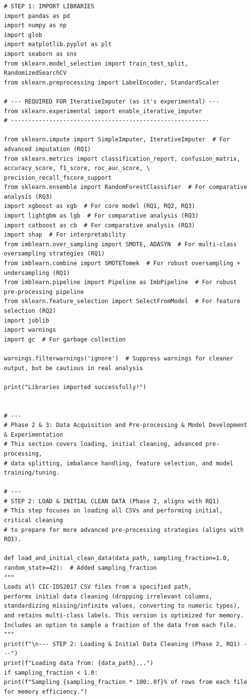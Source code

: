 \begin{lstlisting}[caption={Complete pipeline of XGBoost using CIC-IDS2017 in NIDS using Python}, label={lst:python-pipeline}]
# STEP 1: IMPORT LIBRARIES
import pandas as pd
import numpy as np
import glob
import matplotlib.pyplot as plt
import seaborn as sns
from sklearn.model_selection import train_test_split, RandomizedSearchCV
from sklearn.preprocessing import LabelEncoder, StandardScaler

# --- REQUIRED FOR IterativeImputer (as it's experimental) ---
from sklearn.experimental import enable_iterative_imputer
# ---------------------------------------------------------

from sklearn.impute import SimpleImputer, IterativeImputer  # For advanced imputation (RQ1)
from sklearn.metrics import classification_report, confusion_matrix, accuracy_score, f1_score, roc_auc_score, \
precision_recall_fscore_support
from sklearn.ensemble import RandomForestClassifier  # For comparative analysis (RQ3)
import xgboost as xgb  # For core model (RQ1, RQ2, RQ3)
import lightgbm as lgb  # For comparative analysis (RQ3)
import catboost as cb  # For comparative analysis (RQ3)
import shap  # For interpretability
from imblearn.over_sampling import SMOTE, ADASYN  # For multi-class oversampling strategies (RQ1)
from imblearn.combine import SMOTETomek  # For robust oversampling + undersampling (RQ1)
from imblearn.pipeline import Pipeline as ImbPipeline  # For robust pre-processing pipeline
from sklearn.feature_selection import SelectFromModel  # For feature selection (RQ2)
import joblib
import warnings
import gc  # For garbage collection

warnings.filterwarnings('ignore')  # Suppress warnings for cleaner output, but be cautious in real analysis

print("Libraries imported successfully!")


# ---
# Phase 2 & 3: Data Acquisition and Pre-processing & Model Development & Experimentation
# This section covers loading, initial cleaning, advanced pre-processing,
# data splitting, imbalance handling, feature selection, and model training/tuning.

# ---
# STEP 2: LOAD & INITIAL CLEAN DATA (Phase 2, aligns with RQ1)
# This step focuses on loading all CSVs and performing initial, critical cleaning
# to prepare for more advanced pre-processing strategies (aligns with RQ1).

def load_and_initial_clean_data(data_path, sampling_fraction=1.0, random_state=42):  # Added sampling_fraction
"""
Loads all CIC-IDS2017 CSV files from a specified path,
performs initial data cleaning (dropping irrelevant columns,
standardizing missing/infinite values, converting to numeric types),
and retains multi-class labels. This version is optimized for memory.
Includes an option to sample a fraction of the data from each file.
"""
print(f"\n--- STEP 2: Loading & Initial Data Cleaning (Phase 2, RQ1) ---")
print(f"Loading data from: {data_path}...")
if sampling_fraction < 1.0:
print(f"Sampling {sampling_fraction * 100:.0f}% of rows from each file for memory efficiency.")


\end{lstlisting}
